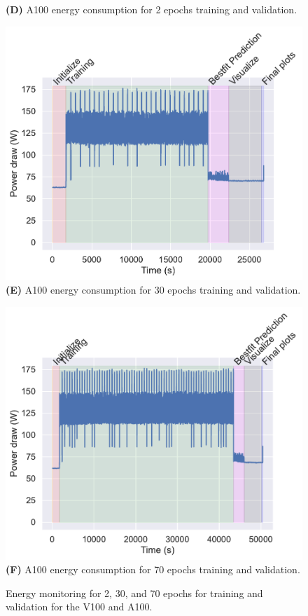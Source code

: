 \documentclass[utf8]{FrontiersinVancouver} %
\begin{document}
\begin{figure}[p]
\begin{center}
\begin{minipage}[t]{0.30\textwidth}
        {\bf (D)} A100 energy consumption for 2 epochs training and validation.
     \end{minipage}
         \begin{minipage}[t]{0.30\textwidth}
        \includegraphics[width=1.0\linewidth]{images/a100-shaded-energy-30-epochs}
        {\bf (E)} A100 energy consumption for 30 epochs training and validation.
     \end{minipage}
         \begin{minipage}[t]{0.30\textwidth}
        \includegraphics[width=1.0\linewidth]{images/a100-shaded-energy-70-epochs}
        {\bf (F)} A100 energy consumption for 70 epochs training and validation.
     \end{minipage}


  \end{center}

  \caption {Energy monitoring for 2, 30, and 70 epochs for training and validation for the V100 and A100.}
  \label{fig:energy}

\end{figure}
\end{document}

